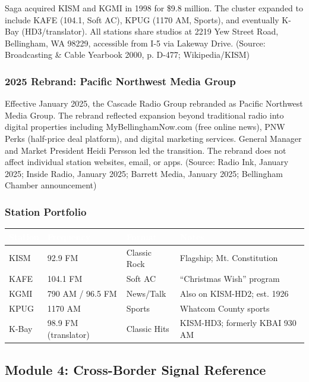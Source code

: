 \documentclass[11pt,letterpaper]{article}
\newcommand{\tableheader}[1]{\textbf{\sffamily\textcolor{white}{#1}}}
\begin{document}
Saga acquired KISM and KGMI in 1998 for \$9.8 million. The cluster expanded to include KAFE (104.1, Soft AC), KPUG (1170 AM, Sports), and eventually K-Bay (HD3/translator). All stations share studios at 2219 Yew Street Road, Bellingham, WA 98229, accessible from I-5 via Lakeway Drive. (Source: Broadcasting \& Cable Yearbook 2000, p. D-477; Wikipedia/KISM)

\subsubsection{2025 Rebrand: Pacific Northwest Media Group}

Effective January 2025, the Cascade Radio Group rebranded as Pacific Northwest Media Group. The rebrand reflected expansion beyond traditional radio into digital properties including MyBellinghamNow.com (free online news), PNW Perks (half-price deal platform), and digital marketing services. General Manager and Market President Heidi Persson led the transition. The rebrand does not affect individual station websites, email, or apps. (Source: Radio Ink, January 2025; Inside Radio, January 2025; Barrett Media, January 2025; Bellingham Chamber announcement)

\subsubsection{Station Portfolio}

\begin{center}
\begin{tabularx}{\textwidth}{L{2cm}L{2cm}L{2.5cm}X}
\toprule
{}
\tableheader{Station} & \tableheader{Frequency} & \tableheader{Format} & \tableheader{Notes} \\
\midrule
KISM & 92.9 FM & Classic Rock & Flagship; Mt. Constitution \\
KAFE & 104.1 FM & Soft AC & ``Christmas Wish'' program \\
KGMI & 790 AM / 96.5 FM & News/Talk & Also on KISM-HD2; est. 1926 \\
KPUG & 1170 AM & Sports & Whatcom County sports \\
K-Bay & 98.9 FM (translator) & Classic Hits & KISM-HD3; formerly KBAI 930 AM \\
\bottomrule
\end{tabularx}
\end{center}

\subsection{Module 4: Cross-Border Signal Reference}
\end{document}
